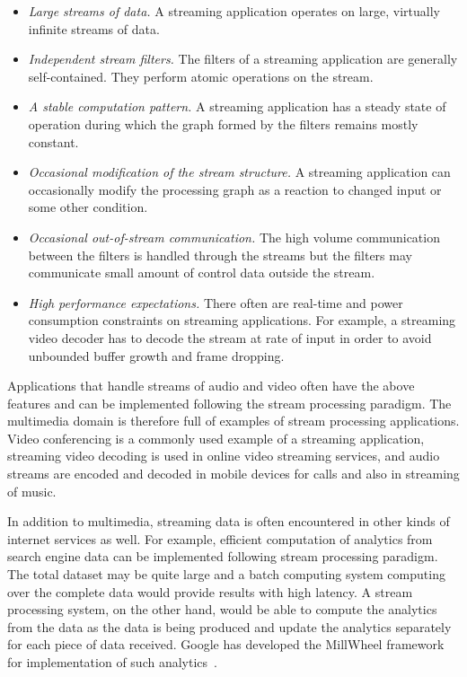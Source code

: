 \begin{itemize}
    \item \textit{Large streams of data.} A streaming application operates on large, virtually infinite streams of data.
    \item \textit{Independent stream filters.} The filters of a streaming application are generally self-contained. They perform atomic operations on the stream.
    \item \textit{A stable computation pattern.} A streaming application has a steady state of operation during which the graph formed by the filters remains mostly constant.
    \item \textit{Occasional modification of the stream structure.} A streaming application can occasionally modify the processing graph as a reaction to changed input or some other condition.
    \item \textit{Occasional out-of-stream communication.} The high volume communication between the filters is handled through the streams but the filters may communicate small amount of control data outside the stream.
    \item \textit{High performance expectations.} There often are real-time and power consumption constraints on streaming applications. For example, a streaming video decoder has to decode the stream at rate of input in order to avoid unbounded buffer growth and frame dropping.
\end{itemize}

Applications that handle streams of audio and video often have the above features and can be implemented following the stream processing paradigm. The multimedia domain is therefore full of examples of stream processing applications. Video conferencing is a commonly used example of a streaming application, streaming video decoding is used in online video streaming services, and audio streams are encoded and decoded in mobile devices for calls and also in streaming of music.

In addition to multimedia, streaming data is often encountered in other kinds of internet services as well. For example, efficient computation of analytics from search engine data can be implemented following stream processing paradigm. The total dataset may be quite large and a batch computing system computing over the complete data would provide results with high latency. A stream processing system, on the other hand, would be able to compute the analytics from the data as the data is being produced and update the analytics separately for each piece of data received. Google has developed the MillWheel framework for implementation of such analytics~\cite{tyler2013millwheel}.

